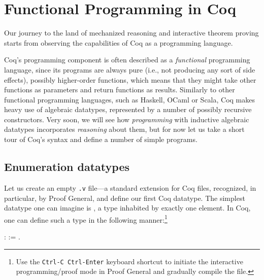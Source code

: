\begin{coqdoccode}
\end{coqdoccode}
\chapter{Functional Programming in Coq}
      \label{ch:funprog} 



Our journey to the land of mechanized reasoning and interactive
theorem proving starts from observing the capabilities of Coq as a
programming language.


Coq's programming component is often described as a \textit{functional}
programming language, since its programs are always pure (i.e., not
producing any sort of side effects), possibly higher-order functions,
which means that they might take other functions as parameters and
return functions as results. Similarly to other functional programming
languages, such as Haskell, OCaml or Scala, Coq makes heavy use of
algebraic datatypes, represented by a number of possibly recursive
constructors.  Very soon, we will see how \textit{programming} with inductive
algebraic datatypes incorporates \textit{reasoning} about them, but for now
let us take a short tour of Coq's syntax and define a number of simple
programs.




\section{Enumeration datatypes}





Let us create an empty \texttt{.v} file---a standard extension for
Coq files, recognized, in particular, by Proof General, and define our
first Coq datatype. The simplest datatype one can imagine is , a
type inhabited by exactly one element.  In Coq, one
can define such a type in the following manner:\footnote{Use the
\texttt{Ctrl-C Ctrl-Enter} keyboard shortcut to initiate the interactive
 programming/proof mode in Proof General
and gradually compile the file.}


\begin{coqdoccode}
\coqdocemptyline
\coqdocnoindent
{}  :  := .\coqdoceol
\coqdocemptyline
\end{coqdoccode}




